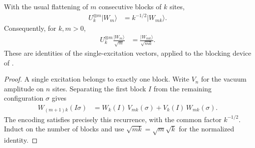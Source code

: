 \begin{lemma}
    \label{lem:w_state_isometric_blocking}
    \leanok
    With the usual flattening of $m$ consecutive blocks of $k$ sites,
    \begin{align}
        U_k^{\otimes m}|W_m\rangle & =k^{-1/2}|W_{mk}\rangle.
        \label{eq:w_state_isometric_blocking}
    \end{align}
    Consequently, for $k,m>0$,
    \begin{align}
        U_k^{\otimes m}\frac{|W_m\rangle}{\sqrt m}
         & =\frac{|W_{mk}\rangle}{\sqrt{mk}}.
        \label{eq:w_state_isometric_blocking_normalized}
    \end{align}
    These are identities of the single-excitation vectors, applied
    to the blocking device of \cite[lines~2090--2097]{PerezGarcia2007Matrix}.
\end{lemma}
\begin{proof}
    \leanok
    A single excitation belongs to exactly one block. Write $V_n$ for the
    vacuum amplitude on $n$ sites. Separating the first block $I$ from the
    remaining configuration $\sigma$ gives
    \begin{align}
        W_{(m+1)k}(I\sigma)
         & =W_k(I)\,V_{mk}(\sigma)+V_k(I)\,W_{mk}(\sigma).
    \end{align}
    The encoding satisfies precisely this recurrence, with the common
    factor $k^{-1/2}$. Induct on the number of blocks and use
    $\sqrt{mk}=\sqrt m\sqrt k$ for the normalized identity.
\end{proof}

